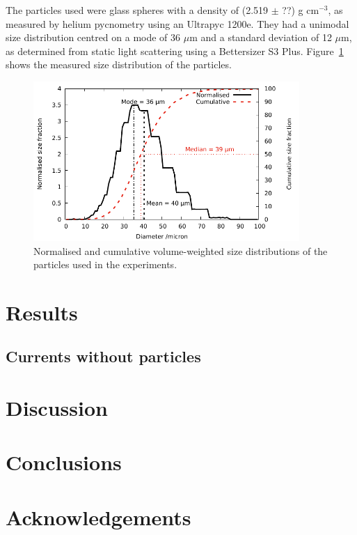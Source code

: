 \documentclass[authoryear,preprint,review,12pt]{elsarticle}
\begin{document}
The particles used were glass spheres with a density of (2.519 $\pm$ ??) g cm$^{-3}$, as measured by helium pycnometry using an Ultrapyc 1200e. They had a unimodal size distribution centred on a mode of 36 $\mu$m and a standard deviation of 12 $\mu$m, as determined from static light scattering using a Bettersizer S3 Plus. Figure~\ref{fig:size_dist} shows the measured size distribution of the particles. 

\begin{figure}[ht!]
  \centerline{\includegraphics[width=0.9\textwidth]{unsieved_dist.pdf}}
  \caption{Normalised and cumulative volume-weighted size distributions of the particles used in the experiments.}
  \label{fig:size_dist}
\end{figure}

\section{Results}
\label{sec:res}

\subsection{Currents without particles}
\label{subsec:res_no_parts}

\section{Discussion}
\label{sec:dis}

\section{Conclusions}
\label{sec:conc}

\section*{Acknowledgements}
\label{sec:acknow}
\end{document}
